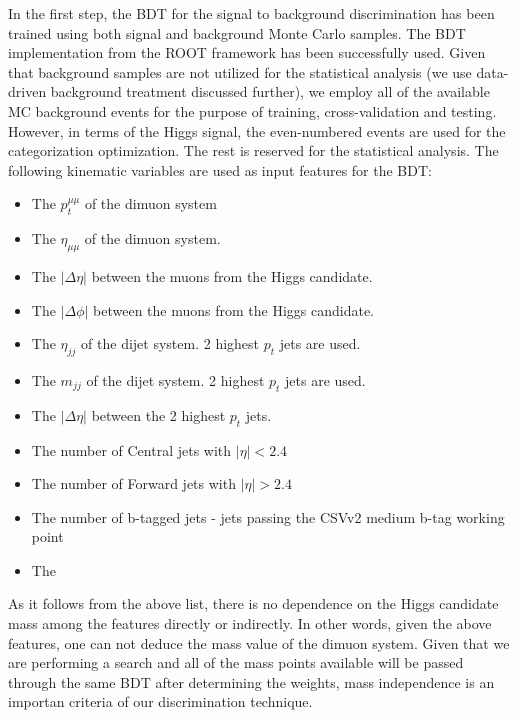 In the first step, the BDT for the signal to background discrimination has been trained using both signal and background Monte Carlo samples. The BDT implementation from the ROOT framework has been successfully used. Given that background samples are not utilized for the statistical analysis (we use data-driven background treatment discussed further), we employ all of the available MC background events for the purpose of training, cross-validation and testing. However, in terms of the Higgs signal, the even-numbered events are used for the categorization optimization. The rest is reserved for the statistical analysis. The following kinematic variables are used as input features for the BDT:
\begin{itemize}
  \item The $p_t^{\mu\mu}$ of the dimuon system
  \item The $\eta_{\mu\mu}$ of the dimuon system.
  \item The $|\Delta \eta|$ between the muons from the Higgs candidate.
  \item The $|\Delta \phi|$ between the muons from the Higgs candidate.
  \item The $\eta_{jj}$ of the dijet system. 2 highest $p_t$ jets are used.
  \item The $m_{jj}$ of the dijet system. 2 highest $p_t$ jets are used.
  \item The $|\Delta \eta|$ between the 2 highest $p_t$ jets.
  \item The number of Central jets with $|\eta| < 2.4$
  \item The number of Forward jets with $|\eta| > 2.4$
  \item The number of b-tagged jets - jets passing the CSVv2 medium b-tag working point
  \item The \MET
\end{itemize}
As it follows from the above list, there is no dependence on the Higgs candidate mass among the features directly or indirectly. In other words, given the above features, one can not deduce the mass value of the dimuon system. Given that we are performing a search and all of the mass points available will be passed through the same BDT after determining the weights, mass independence is an importan criteria of our discrimination technique.

